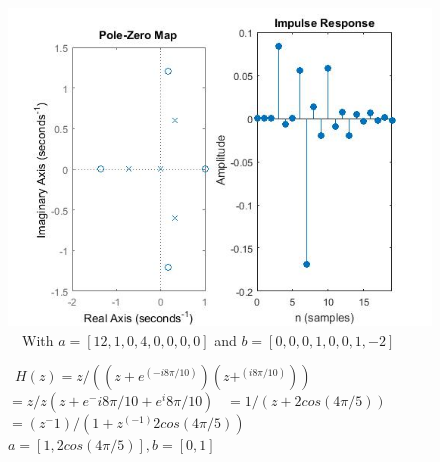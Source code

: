 \documentclass{article}
\begin{document}
\begin{figure}[H]
\includegraphics[scale = .5]{report5_3} \
\ With $a = [12,1,0,4,0,0,0,0]$ and $b =[0,0,0,1,0,0,1,-2]$
\end{figure}

\begin{figure}[H]
\ $H(z) = z/((z+e^(-i8\pi/10))(z+^(i8\pi/10)))$
\ $ = z/z(z + e^-i8\pi/10 + e^i8\pi/10)$
\ $ = 1/(z+2cos(4\pi/5))$
\ $ = (z^-1)/(1 + z^(-1)2cos(4\pi/5))$
\ $ a = [1,2cos(4\pi/5)], b = [0,1]$
\end{figure}



\break
\end{document}
